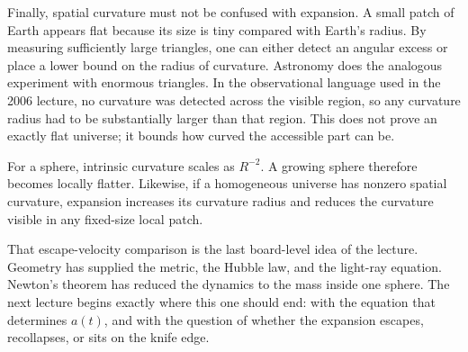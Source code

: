 \begin{classroomqa}
\end{classroomqa}

Finally, spatial curvature must not be confused with expansion. A small
patch of Earth appears flat because its size is tiny compared with Earth's
radius. By measuring sufficiently large triangles, one can either detect an
angular excess or place a lower bound on the radius of curvature. Astronomy
does the analogous experiment with enormous triangles. In the observational
language used in the 2006 lecture, no curvature was detected across the
visible region, so any curvature radius had to be substantially larger than
that region. This does not prove an exactly flat universe; it bounds how
curved the accessible part can be.

For a sphere, intrinsic curvature scales as \(R^{-2}\). A growing sphere
therefore becomes locally flatter. Likewise, if a homogeneous universe has
nonzero spatial curvature, expansion increases its curvature radius and
reduces the curvature visible in any fixed-size local patch.

\begin{classroomqa}
\end{classroomqa}

That escape-velocity comparison is the last board-level idea of the
lecture. Geometry has supplied the metric, the Hubble law, and the
light-ray equation. Newton's theorem has reduced the dynamics to the mass
inside one sphere. The next lecture begins exactly where this one should
end: with the equation that determines \(a(t)\), and with the question of
whether the expansion escapes, recollapses, or sits on the knife edge.
